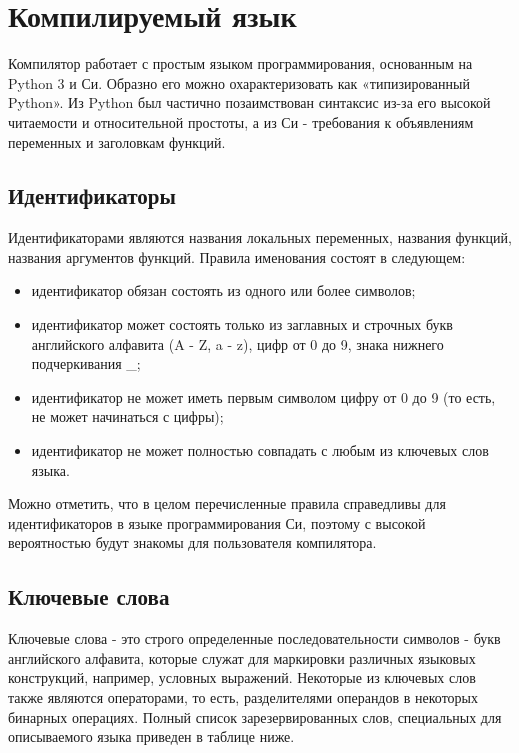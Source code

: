 \newpage
\section{Компилируемый язык}
\label{sec:language}

Компилятор работает с простым языком программирования, основанным на Python 3 и Си.
Образно его можно охарактеризовать как «типизированный Python». Из Python был частично позаимствован синтаксис из-за его высокой читаемости и относительной простоты, а из Си - требования к объявлениям переменных и заголовкам функций.

\subsection{Идентификаторы}

Идентификаторами являются названия локальных переменных, названия функций, названия аргументов функций.
Правила именования состоят в следующем:

\begin{itemize}
    \item идентификатор обязан состоять из одного или более символов;
    \item идентификатор может состоять только из заглавных и строчных букв английского алфавита (A - Z, a - z), цифр от 0 до 9, знака нижнего подчеркивания \_;
    \item идентификатор не может иметь первым символом цифру от 0 до 9 (то есть, не может начинаться с цифры);
    \item идентификатор не может полностью совпадать с любым из ключевых слов языка.

\end{itemize}

Можно отметить, что в целом перечисленные правила справедливы для идентификаторов в языке программирования Си, поэтому с высокой вероятностью будут знакомы для пользователя компилятора.

\subsection{Ключевые слова}

Ключевые слова - это строго определенные последовательности символов - букв английского алфавита, которые служат для маркировки различных языковых конструкций, например, условных выражений.
Некоторые из ключевых слов также являются операторами, то есть, разделителями операндов в некоторых бинарных операциях.
Полный список зарезервированных слов, специальных для описываемого языка приведен в таблице ниже.

